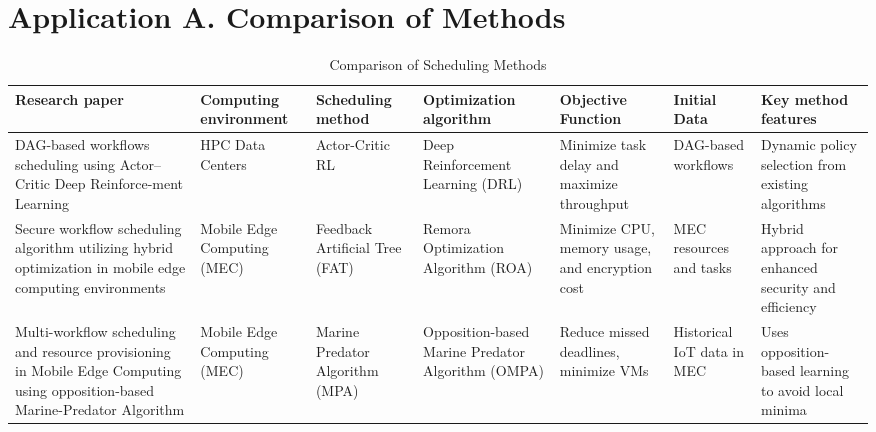 \documentclass[a4paper, final]{article}
\begin{document}
\section* {Application A. Comparison of Methods}
\hypertarget{ApplA}{}
\begin{table}[H]
    \centering
    \caption{Comparison of Scheduling Methods}
    \label{tbl:1}
    \scriptsize
    \begin{tabularx}{\textwidth}{|p{3.5cm}|X|X|p{2cm}|X|X|X|}
    \hline
    \textbf{Research paper} & \textbf{Computing environment} & \textbf{Scheduling method} & 
    \textbf{Optimization algorithm} & \textbf{Objective Function} & \textbf{Initial Data} & 
    \textbf{Key method features} \\
    \hline

    DAG-based workflows scheduling using Actor–Critic Deep Reinforce-ment Learning \cite{bib:1_acrl} &
    HPC Data Centers &
    Actor-Critic RL &
    Deep Reinforcement Learning (DRL) &
    Minimize task delay and maximize throughput &
    DAG-based workflows &
    Dynamic policy selection from existing algorithms \\
    \hline

    Secure workflow scheduling algorithm utilizing hybrid optimization in mobile edge computing environments \cite{bib:2_faro} &
    Mobile Edge Computing (MEC) &
    Feedback Artificial Tree (FAT) &
    Remora Optimization Algorithm (ROA) &
    Minimize CPU, memory usage, and encryption cost &
    MEC resources and tasks &
    Hybrid approach for enhanced security and efficiency \\
    \hline

    Multi-workflow scheduling and resource provisioning in Mobile Edge Computing using opposition-based Marine-Predator Algorithm \cite{bib:6_marine} &
    Mobile Edge Computing (MEC) &
    Marine Predator Algorithm (MPA) &
    Opposition-based Marine Predator Algorithm (OMPA) &
    Reduce missed deadlines, minimize VMs &
    Historical IoT data in MEC &
    Uses opposition-based learning to avoid local minima \\
    \hline
    


\end{tabularx}
\end{table}
\end{document}
